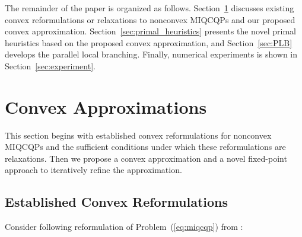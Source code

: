 \documentclass[]{article}
\begin{document}
The remainder of the paper is organized as follows. Section~\ref{sec:convex_approx} discusses existing convex reformulations or relaxations to nonconvex MIQCQPs and our proposed convex approximation. Section~\ref{sec:primal_heuristics} presents the novel primal heuristics based on the proposed convex approximation, and Section~\ref{sec:PLB} develops the parallel local branching. Finally, numerical experiments is shown in Section~\ref{sec:experiment}.


\section{Convex Approximations}\label{sec:convex_approx}

This section begins with established convex reformulations for nonconvex MIQCQPs and the sufficient conditions under which these reformulations are relaxations. Then we propose a convex approximation and a novel fixed-point approach to iteratively refine the approximation.

\subsection{Established Convex Reformulations}

Consider following reformulation of Problem~(\ref{eq:miqcqp}) from \cite{billionnet2016exact}:
\end{document}
